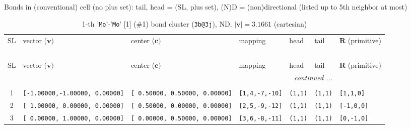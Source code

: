 \documentclass[fleqn,10pt,landscape]{jsarticle}
\begin{document}
\noindent Bonds in (conventional) cell (no plus set): tail, head = (SL, plus set), (N)D = (non)directional (listed up to 5th neighbor at most)

\renewcommand{\arraystretch}{1.6}
\begin{longtable}[l]{cllllll}
\captionsetup{justification=raggedright, singlelinecheck=off}
\caption{1-th '\texttt{Mo}'-'\texttt{Mo}' [1] (\#1) bond cluster (\texttt{3b@3j}), ND, $|\bm{v}|=3.1661$ (cartesian)}
 \\
 \hline \hline
SL & vector ($\bm{v})$ & center ($\bm{c})$ & mapping & head & tail & $\bm{R}$ (primitive) \\ \hline \endfirsthead

\multicolumn{6}{l}{\tablename\ \thetable{}} \\
 \hline \hline
SL & vector ($\bm{v})$ & center ($\bm{c})$ & mapping & head & tail & $\bm{R}$ (primitive) \\ \hline \endhead

 \hline \hline
\multicolumn{6}{r}{\footnotesize\it continued ...} \\ \endfoot

 \hline \hline
\multicolumn{6}{r}{} \\ \endlastfoot

1 & \texttt{[-1.00000,-1.00000, 0.00000]} & \texttt{[ 0.50000, 0.50000, 0.00000]} & \texttt{[1,4,-7,-10]} & \texttt{(1,1)} & \texttt{(1,1)} & \texttt{[1,1,0]} \\ \hline
2 & \texttt{[ 1.00000, 0.00000, 0.00000]} & \texttt{[ 0.50000, 0.00000, 0.00000]} & \texttt{[2,5,-9,-12]} & \texttt{(1,1)} & \texttt{(1,1)} & \texttt{[-1,0,0]} \\ \hline
3 & \texttt{[ 0.00000, 1.00000, 0.00000]} & \texttt{[ 0.00000, 0.50000, 0.00000]} & \texttt{[3,6,-8,-11]} & \texttt{(1,1)} & \texttt{(1,1)} & \texttt{[0,-1,0]} \\
\end{longtable}
\renewcommand{\arraystretch}{1.6}
\end{document}
